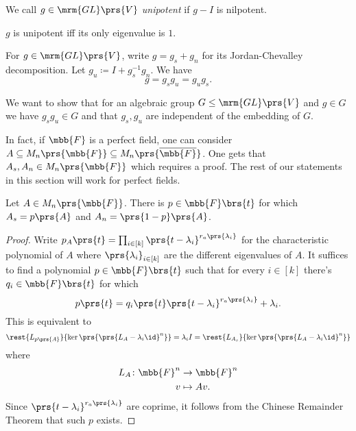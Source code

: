 \documentclass[10pt,a4paper,twoside,openany,hidelinks]{book}
\begin{document}
\begin{definition}
We call $g \in \mrm{GL}\prs{V}$ \emph{unipotent} if $g - I$ is nilpotent.
\end{definition}

\begin{remark}
$g$ is unipotent iff its only eigenvalue is $1$.
\end{remark}

For $g \in \mrm{GL}\prs{V}$, write $g = g_s + g_n$ for its Jordan-Chevalley decomposition. Let $g_u \coloneqq I + g_s^{-1} g_n$. We have
\[g = g_s g_u = g_u g_s \text{.}\]

We want to show that for an algebraic group $G \leq \mrm{GL}\prs{V}$ and $g \in G$ we have $g_s g_u \in G$ and that $g_s, g_u$ are independent of the embedding of $G$.

\begin{remark}
In fact, if $\mbb{F}$ is a perfect field, one can consider $A \subseteq M_n\prs{\mbb{F}} \subseteq M_n\prs{\overline{\mbb{F}}}$. One gets that $A_s, A_n \in M_n\prs{\mbb{F}}$ which requires a proof. The rest of our statements in this section will work for perfect fields.
\end{remark}

\begin{proposition}
Let $A \in M_n\prs{\mbb{F}}$. There is $p \in \mbb{F}\brs{t}$ for which $A_s = p\prs{A}$ and $A_n = \prs{1-p}\prs{A}$.
\end{proposition}

\begin{proof}
Write $p_A\prs{t} = \prod_{i \in [k]} \prs{t - \lambda_i}^{r_a\prs{\lambda_i}}$ for the characteristic polynomial of $A$ where $\prs{\lambda_i}_{i \in [k]}$ are the different eigenvalues of $A$.
It suffices to find a polynomial $p \in \mbb{F}\brs{t}$ such that for every $i \in [k]$ there's $q_i \in \mbb{F}\brs{t}$ for which
\[p\prs{t} = q_i\prs{t} \prs{t-\lambda_i}^{r_a\prs{\lambda_i}} + \lambda_i \text{.}\]
This is  equivalent to 
\[\rest{L_{p\prs{A}}}{\ker\prs{\prs{L_A - \lambda_i \id}^n}} = \lambda_i I = \rest{L_{A_s}}{\ker\prs{\prs{L_A - \lambda_i \id}^n}}\]
where
\begin{align*}
L_A \colon \mbb{F}^n &\to \mbb{F}^n \\
v &\mapsto Av \text{.}
\end{align*}
Since $\prs{t - \lambda_i}^{r_a\prs{\lambda_i}}$ are coprime, it follows from the Chinese Remainder Theorem that such $p$ exists.
\end{proof}
\end{document}
